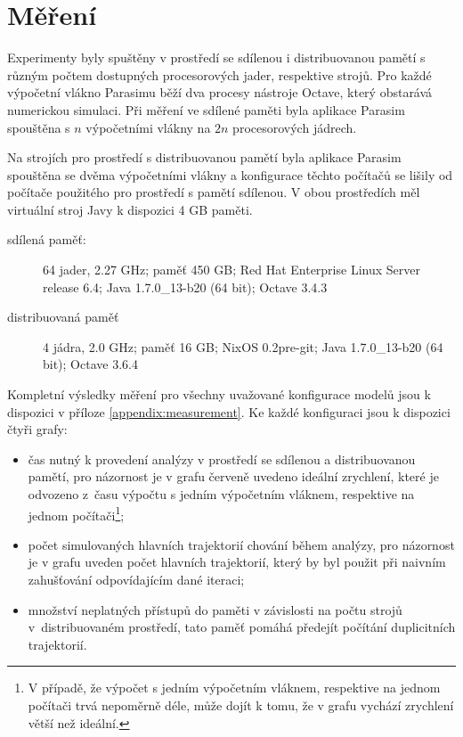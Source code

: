 \section{Měření}\label{section:measurement}

Experimenty byly spuštěny v prostředí se sdílenou i distribuovanou pamětí s různým
počtem dostupných procesorových jader, respektive strojů. Pro každé výpočetní vlákno
Parasimu běží dva procesy nástroje Octave, který obstarává numerickou simulaci. Při měření
ve sdílené paměti byla aplikace Parasim spouštěna s $n$ výpočetními vlákny na $2n$
procesorových jádrech.

Na strojích pro prostředí s distribuovanou pamětí byla aplikace Parasim spouštěna se dvěma
výpočetními vlákny a konfigurace těchto počítačů se lišily od počítače použitého pro prostředí
s pamětí sdílenou. V obou prostředích měl virtuální stroj Javy k dispozici 4 GB paměti.

\begin{description}
	\item[sdílená paměť: ]
		 64 jader, 2.27 GHz; paměť 450 GB; Red Hat Enterprise Linux Server release 6.4; Java 1.7.0\_13-b20 (64 bit); Octave 3.4.3
	\item[distribuovaná paměť]
		4 jádra, 2.0 GHz; paměť 16 GB; NixOS 0.2pre-git; Java 1.7.0\_13-b20 (64 bit); Octave 3.6.4
\end{description}

Kompletní výsledky měření pro všechny uvažované konfigurace modelů jsou k dispozici
v příloze \ref{appendix:measurement}. Ke každé konfiguraci jsou k dispozici čtyři grafy:

\begin{itemize}
	\item	čas nutný k provedení analýzy v prostředí se sdílenou a distribuovanou pamětí,
			pro názornost je v grafu červeně uvedeno ideální zrychlení, které je odvozeno
			z~času výpočtu s jedním výpočetním vláknem, respektive na jednom počítači\footnote{V případě, že výpočet s jedním výpočetním vláknem, respektive na jednom počítači trvá nepoměrně déle, může dojít k tomu, že v grafu vychází zrychlení větší než ideální.};
	\item	počet simulovaných hlavních trajektorií chování během analýzy, pro názornost je v grafu
			uveden počet hlavních trajektorií, který by byl použit při naivním zahušťování odpovídajícím
			dané iteraci;
	\item	množství neplatných přístupů do paměti v závislosti na počtu strojů v~dis\-tri\-buova\-ném prostředí,
			tato paměť pomáhá předejít po\-čí\-tá\-ní duplicitních trajektorií.
\end{itemize}

